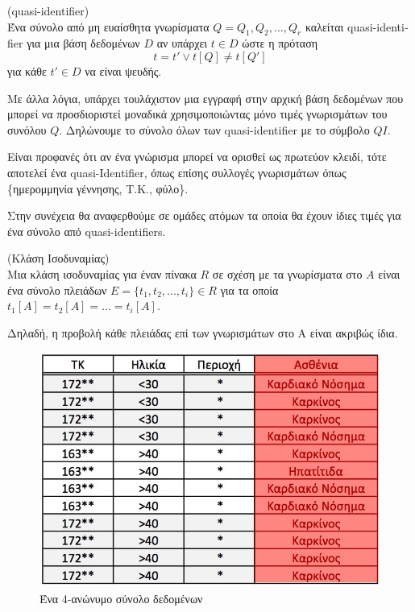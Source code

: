 \begin{definition}(\textlatin{quasi-identifier})\\
Ένα σύνολο από μη ευαίσθητα γνωρίσματα $Q={Q_1,Q_2,...,Q_r}$ καλείται \textlatin{quasi-identifier} για μια βάση δεδομένων $D$ αν υπάρχει $t \in D$ ώστε η πρόταση
$$ t=t' \lor t[Q]\neq t[Q'] $$ για κάθε $t'\in D$ να είναι ψευδής.
\end{definition}

Με άλλα λόγια, υπάρχει τουλάχιστον μια εγγραφή στην αρχική βάση δεδομένων που μπορεί να προσδιοριστεί μοναδικά χρησιμοποιώντας μόνο τιμές γνωρισμάτων του συνόλου $Q$. Δηλώνουμε το σύνολο όλων των \textlatin{quasi-identifier} με το σύμβολο $QI$.

Είναι προφανές ότι αν ένα γνώρισμα μπορεί να ορισθεί ως πρωτεύον κλειδί, τότε αποτελεί ένα \textlatin{quasi-Identifier}, όπως επίσης συλλογές γνωρισμάτων όπως \{ημερομμηνία γέννησης, Τ.Κ., φύλο\}. 

Στην συνέχεια θα αναφερθούμε σε ομάδες ατόμων τα οποία θα έχουν ίδιες τιμές για ένα σύνολο από \textlatin{quasi-identifiers}.

\begin{definition}(Κλάση Ισοδυναμίας)\\
Μια κλάση ισοδυναμίας για έναν πίνακα $R$ σε σχέση με τα γνωρίσματα στο $A$ είναι ένα σύνολο πλειάδων $E=\{t_1,t_2,...,t_i\} \in R$ για τα οποία $t_1[A]=t_2[A]=...=t_i[A]$. 
\end{definition}
Δηλαδή, η προβολή κάθε πλειάδας επί των γνωρισμάτων στο Α είναι ακριβώς ίδια.



\begin{figure} [h!]
\begin{center}
  \includegraphics[scale=0.36]{images/k-anon.jpg}
  \caption{Ένα 4-ανώνυμο σύνολο δεδομένων}
  \end{center}
\end{figure}

